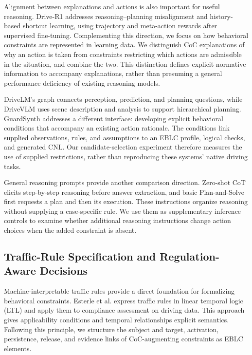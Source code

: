 \documentclass[nolineno]{ieeeaccess}
\begin{document}
Alignment between explanations and actions is also important for useful reasoning. Drive-R1 addresses reasoning--planning misalignment and history-based shortcut learning, using trajectory and meta-action rewards after supervised fine-tuning. Complementing this direction, we focus on how behavioral constraints are represented in learning data. We distinguish CoC explanations of why an action is taken from constraints restricting which actions are admissible in the situation, and combine the two. This distinction defines explicit normative information to accompany explanations, rather than presuming a general performance deficiency of existing reasoning models. \cite{r5}\par

DriveLM's graph connects perception, prediction, and planning questions, while DriveVLM uses scene description and analysis to support hierarchical planning. GuardSynth addresses a different interface: developing explicit behavioral conditions that accompany an existing action rationale. The conditions link supplied observations, rules, and assumptions to an EBLC profile, logical checks, and generated CNL. Our candidate-selection experiment therefore measures the use of supplied restrictions, rather than reproducing these systems' native driving tasks. \cite{r2,r3}\par

General reasoning prompts provide another comparison direction. Zero-shot CoT elicits step-by-step reasoning before answer extraction, and basic Plan-and-Solve first requests a plan and then its execution. These instructions organize reasoning without supplying a case-specific rule. We use them as supplementary inference controls to examine whether additional reasoning instructions change action choices when the added constraint is absent. \cite{r16,r17}\par

\subsection{Traffic-Rule Specification and Regulation-Aware Decisions}

Machine-interpretable traffic rules provide a direct foundation for formalizing behavioral constraints. Esterle et al. express traffic rules in linear temporal logic (LTL) and apply them to compliance assessment on driving data. This approach gives applicability conditions and temporal relationships explicit semantics. Following this principle, we structure the subject and target, activation, persistence, release, and evidence links of CoC-augmenting constraints as EBLC elements. \cite{r6}\par
\end{document}

